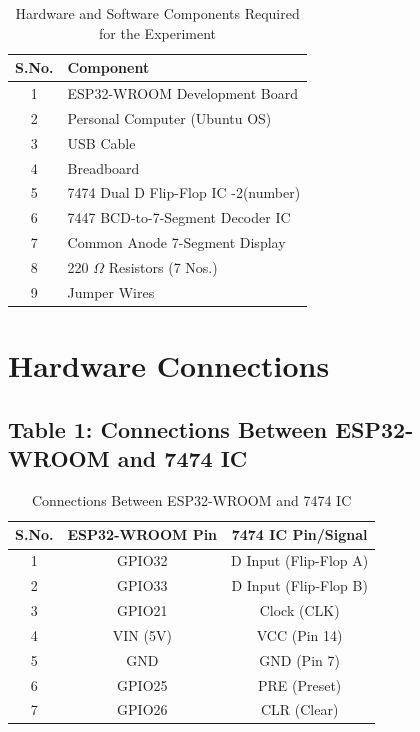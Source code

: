 \documentclass[12pt,a4paper]{article}
\begin{document}
\begin{table}[h]
\centering
\begin{tabular}{|c|l|}
\hline
\textbf{S.No.} & \textbf{Component} \\ \hline
1 & ESP32-WROOM Development Board \\ \hline
2 & Personal Computer (Ubuntu OS) \\ \hline
3 & USB Cable \\ \hline
4 & Breadboard \\ \hline
5 & 7474 Dual D Flip-Flop IC -2(number) \\ \hline
6 & 7447 BCD-to-7-Segment Decoder IC \\ \hline
7 & Common Anode 7-Segment Display \\ \hline
8 & 220 $\Omega$ Resistors (7 Nos.) \\ \hline
9 & Jumper Wires \\ \hline
\end{tabular}
\caption{Hardware and Software Components Required for the Experiment}
\label{tab:hardware_components}
\end{table}
\vspace{3 cm}
\section*{Hardware Connections}

\subsection*{Table 1: Connections Between ESP32-WROOM and 7474 IC}

\begin{table}[h]
\centering
\begin{tabular}{|c|c|c|}
\hline
\textbf{S.No.} & \textbf{ESP32-WROOM Pin} & \textbf{7474 IC Pin/Signal} \\ \hline
1 & GPIO32 & D Input (Flip-Flop A) \\ \hline
2 & GPIO33 & D Input (Flip-Flop B) \\ \hline
3 & GPIO21 & Clock (CLK) \\ \hline
4 & VIN (5V) & VCC (Pin 14) \\ \hline
5 & GND & GND (Pin 7) \\ \hline
6 & GPIO25 & PRE (Preset) \\ \hline
7 & GPIO26 & CLR (Clear) \\ \hline
\end{tabular}
\caption{Connections Between ESP32-WROOM and 7474 IC}
\label{tab:esp32_7474}
\end{table}
\end{document}
